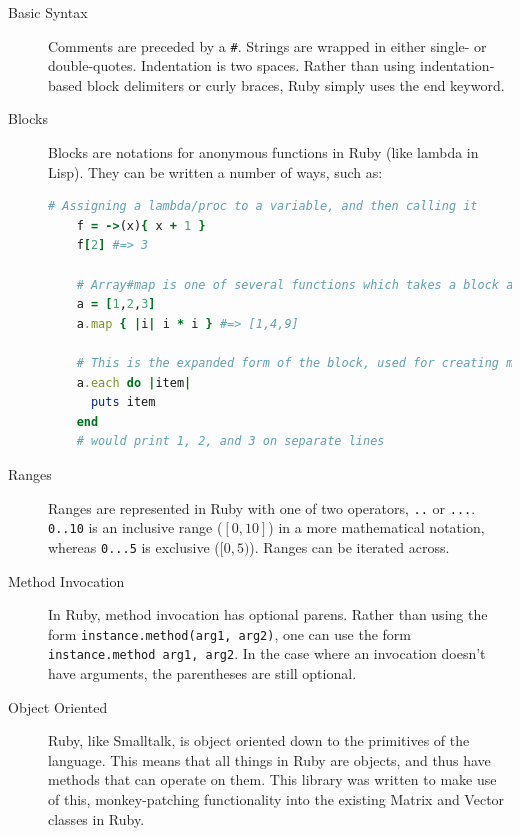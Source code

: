 \documentclass[letterpaper,12pt]{article}
\begin{document}
\begin{description}

\item[Basic Syntax]

  Comments are preceded by a \texttt{\#}.
  Strings are wrapped in either single- or double-quotes.
  Indentation is two spaces.
  Rather than using indentation-based block delimiters or curly braces,
  Ruby simply uses the end keyword.

\item[Blocks]

  Blocks are notations for anonymous functions in Ruby (like lambda in Lisp).
  They can be written a number of ways, such as:
  
  \begin{lstlisting}[language=ruby]
    # Assigning a lambda/proc to a variable, and then calling it
    f = ->(x){ x + 1 }
    f[2] #=> 3

    # Array#map is one of several functions which takes a block as an argument
    a = [1,2,3]
    a.map { |i| i * i } #=> [1,4,9]

    # This is the expanded form of the block, used for creating multi-line anonymous functions
    a.each do |item|
      puts item
    end
    # would print 1, 2, and 3 on separate lines
  \end{lstlisting}
  
\item[Ranges]
  
  Ranges are represented in Ruby with one of two operators, \texttt{..} or \texttt{...}.
  \texttt{0..10} is an inclusive range ($[0,10]$) in a more mathematical notation,
  whereas \texttt{0...5} is exclusive ($[0,5)$).
  Ranges can be iterated across.
  
\item[Method Invocation]

  In Ruby, method invocation has optional parens.
  Rather than using the form \texttt{instance.method(arg1, arg2)},
  one can use the form \texttt{instance.method arg1, arg2}.
  In the case where an invocation doesn't have arguments,
  the parentheses are still optional.

\item[Object Oriented]

  Ruby, like Smalltalk, is object oriented down to the primitives of the language.
  This means that all things in Ruby are objects, and thus have methods that can
  operate on them.
  This library was written to make use of this, monkey-patching functionality into
  the existing Matrix and Vector classes in Ruby.


\end{description}
\end{document}
